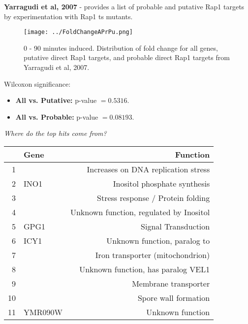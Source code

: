 \documentclass{beamer}
\begin{document}
\begin{frame}
    \textbf{Yarragudi et al, 2007} - provides a list of probable and putative Rap1 targets by experimentation with Rap1 ts mutants.
    \begin{figure}[ht!]
            \centering
            \texttt{[image: ../FoldChangeAPrPu.png]}
            \caption{0 - 90 minutes induced. Distribution of fold change for {\color{gray} all genes}, {\color{blue} putative direct Rap1 targets}, and {\color{red} probable direct Rap1 targets} from Yarragudi et al, 2007.}
            \label{fig:targ}
        \end{figure}
    Wilcoxon significance:
    \begin{itemize}
        \item \textbf{All vs. Putative:} p-value $= 0.5316$.
        \item \textbf{All vs. Probable:} p-value $= 0.08193$.
    \end{itemize}
\end{frame}

\begin{frame}
    \emph{Where do the top hits come from?}
    \pause
    \begin{table}[ht]
        \centering
        \begin{tabular}{rlr}
            \toprule
            & Gene & Function \\ 
            \midrule
            1 & \textbf{\color{red}{TIS11}} & Increases on DNA replication stress \\ 
            2 & INO1 & Inositol phosphate synthesis \\ 
            3 & \textbf{\color{red}{SSA2}} & Stress response / Protein folding \\ 
            4 & \textbf{\color{red}{YEL073C}} & Unknown function, regulated by Inositol  \\ 
            5 & GPG1 & Signal Transduction \\ 
            6 & ICY1 & Unknown function, paralog to \textbf{\color{red}{ICY2}} \\ 
            7 & \textbf{\color{red}{MRS3}} & Iron transporter (mitochondrion) \\ 
            8 & \textbf{\color{red}{YOR387C}} &  Unknown function, has paralog VEL1\\ 
            9 & \textbf{\color{red}{PDR12}} &  Membrane transporter\\ 
            10 & \textbf{\color{red}{GSC2}} &  Spore wall formation\\ 
            11 & YMR090W & Unknown function \\ 
            \bottomrule
        \end{tabular}
    \end{table}
\end{frame}
\end{document}
